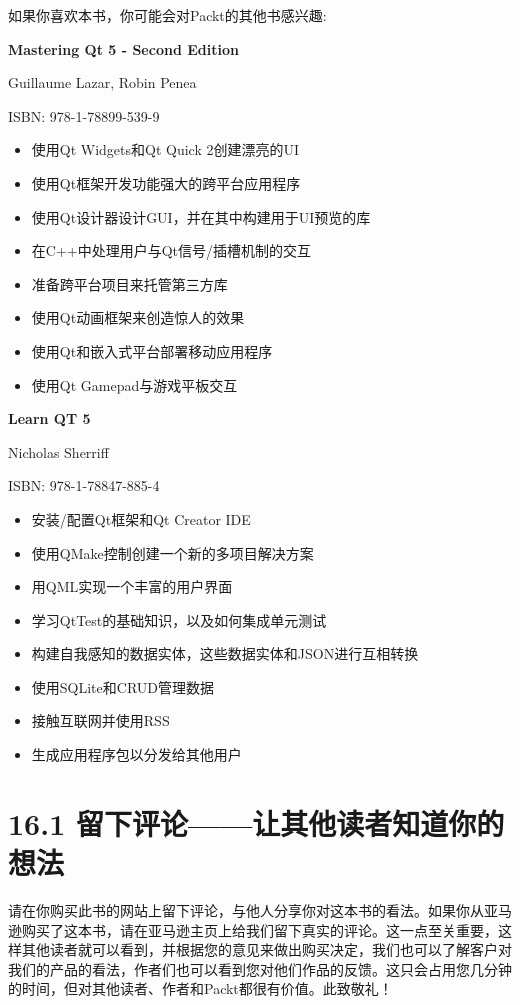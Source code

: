 如果你喜欢本书，你可能会对Packt的其他书感兴趣:


\textbf{Mastering Qt 5 - Second Edition}

Guillaume Lazar, Robin Penea

ISBN: 978-1-78899-539-9

\begin{itemize}
\item 使用Qt Widgets和Qt Quick 2创建漂亮的UI

\item 使用Qt框架开发功能强大的跨平台应用程序

\item 使用Qt设计器设计GUI，并在其中构建用于UI预览的库

\item 在C++中处理用户与Qt信号/插槽机制的交互

\item 准备跨平台项目来托管第三方库

\item 使用Qt动画框架来创造惊人的效果

\item 使用Qt和嵌入式平台部署移动应用程序

\item 使用Qt Gamepad与游戏平板交互

\end{itemize}


\textbf{Learn QT 5}

Nicholas Sherriff

ISBN: 978-1-78847-885-4

\begin{itemize}
\item 安装/配置Qt框架和Qt Creator IDE

\item 使用QMake控制创建一个新的多项目解决方案

\item 用QML实现一个丰富的用户界面

\item 学习QtTest的基础知识，以及如何集成单元测试

\item 构建自我感知的数据实体，这些数据实体和JSON进行互相转换

\item 使用SQLite和CRUD管理数据

\item 接触互联网并使用RSS

\item 生成应用程序包以分发给其他用户

\end{itemize}


\section{16.1 留下评论——让其他读者知道你的想法}

请在你购买此书的网站上留下评论，与他人分享你对这本书的看法。如果你从亚马逊购买了这本书，请在亚马逊主页上给我们留下真实的评论。这一点至关重要，这样其他读者就可以看到，并根据您的意见来做出购买决定，我们也可以了解客户对我们的产品的看法，作者们也可以看到您对他们作品的反馈。这只会占用您几分钟的时间，但对其他读者、作者和Packt都很有价值。此致敬礼！


